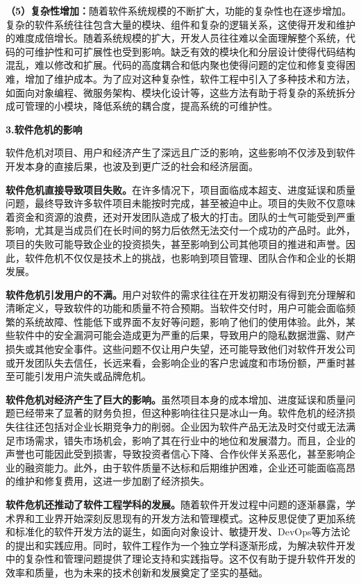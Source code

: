 \documentclass[12pt,a4paper]{article}
\begin{document}
\textbf{（5）复杂性增加：}随着软件系统规模的不断扩大，功能的复杂性也在逐步增加。复杂的软件系统往往包含大量的模块、组件和复杂的逻辑关系，这使得开发和维护的难度成倍增长。随着系统规模的扩大，开发人员往往难以全面理解整个系统，代码的可维护性和可扩展性也受到影响。缺乏有效的模块化和分层设计使得代码结构混乱，难以修改和扩展。代码的高度耦合和低内聚也使得问题的定位和修复变得困难，增加了维护成本。为了应对这种复杂性，软件工程中引入了多种技术和方法，如面向对象编程、微服务架构、模块化设计等，这些方法有助于将复杂的系统拆分成可管理的小模块，降低系统的耦合度，提高系统的可维护性。

\textbf{3.软件危机的影响}

软件危机对项目、用户和经济产生了深远且广泛的影响，这些影响不仅涉及到软件开发本身的直接后果，也波及到更广泛的社会和经济层面。

\textbf{软件危机直接导致项目失败。}在许多情况下，项目面临成本超支、进度延误和质量问题，最终导致许多软件项目未能按时完成，甚至被迫中止。项目的失败不仅意味着资金和资源的浪费，还对开发团队造成了极大的打击。团队的士气可能受到严重影响，尤其是当成员们在长时间的努力后依然无法交付一个成功的产品时。此外，项目的失败可能导致企业的投资损失，甚至影响到公司其他项目的推进和声誉。因此，软件危机不仅仅是技术上的挑战，也影响到项目管理、团队合作和企业的长期发展。

\textbf{软件危机引发用户的不满。}用户对软件的需求往往在开发初期没有得到充分理解和清晰定义，导致软件的功能和质量不符合预期。当软件交付时，用户可能会面临频繁的系统故障、性能低下或界面不友好等问题，影响了他们的使用体验。此外，某些软件中的安全漏洞可能会造成更为严重的后果，导致用户的隐私数据泄露、财产损失或其他安全事件。这些问题不仅让用户失望，还可能导致他们对软件开发公司或开发团队失去信任，长远来看，会影响企业的客户忠诚度和市场份额，严重时甚至可能引发用户流失或品牌危机。

\textbf{软件危机对经济产生了巨大的影响。}虽然项目本身的成本增加、进度延误和质量问题已经带来了显著的财务负担，但这种影响往往只是冰山一角。软件危机的经济损失往往还包括对企业长期竞争力的削弱。企业因为软件产品无法及时交付或无法满足市场需求，错失市场机会，影响了其在行业中的地位和发展潜力。而且，企业的声誉也可能因此受到损害，导致投资者信心下降、合作伙伴关系恶化，甚至影响企业的融资能力。此外，由于软件质量不达标和后期维护困难，企业还可能面临高昂的维护和修复费用，这进一步加剧了经济损失。

\textbf{软件危机还推动了软件工程学科的发展。}随着软件开发过程中问题的逐渐暴露，学术界和工业界开始深刻反思现有的开发方法和管理模式。这种反思促使了更加系统和标准化的软件开发方法的诞生，如面向对象设计、敏捷开发、DevOps等方法论的提出和实践应用。同时，软件工程作为一个独立学科逐渐形成，为解决软件开发中的复杂性和管理问题提供了理论支持和实践指导。这不仅有助于提升软件开发的效率和质量，也为未来的技术创新和发展奠定了坚实的基础。
\end{document}
